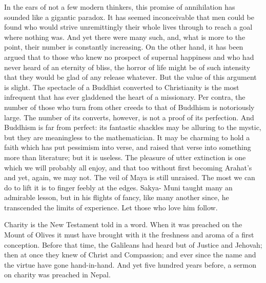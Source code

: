 \documentclass[]{book}
\begin{document}
In the ears of not a few modern thinkers, this promise of annihilation
has sounded like a gigantic paradox. It has seemed inconceivable that
men could be found who would strive unremittingly their whole lives
through to reach a goal where nothing was. And yet there were many such,
and, what is more to the point, their number is constantly increasing.
On the other hand, it has been argued that to those who knew no prospect
of supernal happiness and who had never heard of an eternity of bliss,
the horror of life might be of such intensity that they would be glad of
any release whatever. But the value of this argument is slight. The
spectacle of a Buddhist converted to Christianity is the most infrequent
that has ever gladdened the heart of a missionary. Per contra, the
number of those who turn from other creeds to that of Buddhism is
notoriously large. The number of its converts, however, is not a proof
of its perfection. And Buddhism is far from perfect: its fantastic
shackles may be alluring to the mystic, but they are meaningless to the
mathematician. It may be charming to hold a faith which has put
pessimism into verse, and raised that verse into something more than
literature; but it is useless. The pleasure of utter extinction is one
which we will probably all enjoy, and that too without first becoming
Arahat's and yet, again, we may not. The veil of Maya is still unraised.
The most we can do to lift it is to finger feebly at the edges. Sakya-
Muni taught many an admirable lesson, but in his flights of fancy, like
many another since, he transcended the limits of experience. Let those
who love him follow.

Charity is the New Testament told in a word. When it was preached on the
Mount of Olives it must have brought with it the freshness and aroma of
a first conception. Before that time, the Galileans had heard but of
Justice and Jehovah; then at once they knew of Christ and Compassion;
and ever since the name and the virtue have gone hand-in-hand. And yet
five hundred years before, a sermon on charity was preached in Nepal.
\end{document}

